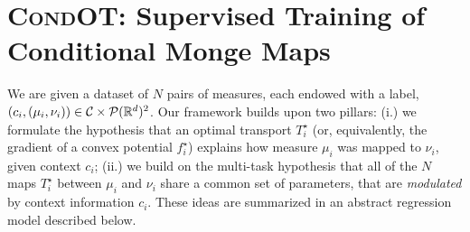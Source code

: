 \section{\textsc{CondOT}: Supervised Training of Conditional Monge Maps} \label{sec:method}
We are given a dataset of $N$ pairs of measures, each endowed with a label, $(c_i,(\mu_i, \nu_i))\in\mathcal{C}\times \mathcal{P}(\mathbb{R}^d)^2$. Our framework builds upon two pillars: (i.) we formulate the hypothesis that an optimal transport $T^\star_i$ (or, equivalently, the gradient of a convex potential $f^\star_i$) explains how measure $\mu_i$ was mapped to $\nu_i$, given context $c_i$; (ii.) we build on the multi-task hypothesis \citep{caruana1997multitask} that all of the $N$ maps $T^\star_i$ between $\mu_i$ and $\nu_i$ share a common set of parameters, that are \textit{modulated} by context information $c_i$. These ideas are summarized in an abstract regression model described below.


